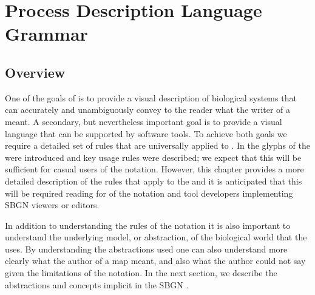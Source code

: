 \chapter{Process Description Language Grammar}
\label{chp:grammar}

\section{Overview}

One of the goals of \SBGNPDLone is to provide a visual description of biological systems that can accurately and unambiguously  convey to the reader what the writer of a \PDm meant. A secondary, but nevertheless important goal is to provide a visual language that can be supported by software tools. To achieve both goals we require a detailed set of rules that are universally applied to \PDms. In  the glyphs of the \PDl were introduced and key usage rules were described; we expect that this will be sufficient for casual users of the notation. However, this chapter provides a more detailed description of the rules that apply to the \PDl and it is anticipated that this will be required reading for  of the notation and tool developers implementing SBGN \PD viewers or editors.

In addition to understanding the rules of the notation it is also important to understand the underlying model, or abstraction, of the biological world that the \PDl uses. By understanding the abstractions used one can also understand more clearly what the author of a map meant, and also what the author could not say given the limitations of the notation. In the next section, we describe the abstractions and concepts implicit in the SBGN \PDl.



